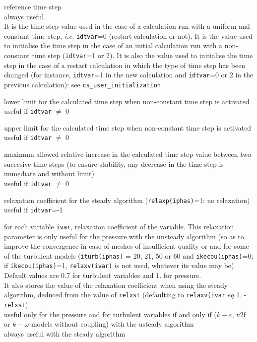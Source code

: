 {reference time step \\
always useful.\\
It is the time step value used in the case of a calculation run with a
uniform and constant time step, {\em i.e.} {\tt idtvar}=0 (restart calculation
or not). It is the value used to initialise the time step in the case of
an initial calculation run with a non-constant time step
({\tt idtvar}=1 or 2). It is also the value used to initialise the time step
in the case of a restart calculation in which the type of
time step has been changed (for instance, {\tt idtvar}=1 in the new
calculation and {\tt idtvar}=0 or 2 in the previous calculation): see
\texttt{cs\_user\_initialization}}

{lower limit for the calculated time step when non-constant time step is activated\\
useful if {\tt idtvar} $\ne$ 0}

{upper limit for the calculated time step when non-constant time step is activated\\
useful if {\tt idtvar} $\ne$ 0}

{maximum allowed relative increase in the calculated time step value
between two succesive time steps (to ensure stability, any decrease in the time step
is immediate and without limit)\\
useful if {\tt idtvar} $\ne$ 0}

{relaxation coefficient for the steady algorithm
 ({\tt relaxp(iphas)}=1: no relaxation)\\
useful if {\tt idtvar}=-1}

{for each variable {\tt ivar}, relaxation coefficient of the variable.
This relaxation parameter is only useful for the pressure with the unsteady
algorithm (so as to improve the convergence in case of meshes of insufficient
quality or and for some of the turbulent models ({\tt iturb(iphas)} = 20, 21,
50 or 60 and {\tt ikecou(iphas)}=0; if {\tt ikecou(iphas)}=1, {\tt relaxv(ivar)}
is not used, whatever its value may be). Default values are 0.7 for turbulent
variables and 1. for pressure.\\
It also stores the value of the relaxation coefficient when using the steady
algorithm, deduced from the value of {\tt relxst} (defaulting to
 {\tt relaxv(ivar} $eq$  {1. - \tt relxst})\\
useful only for the pressure and for turbulent variables
if and only if ($k-\varepsilon$, v2f or $k-\omega$ models without coupling)
 with the usteady algorithm\\
always useful with the steady algorithm}


